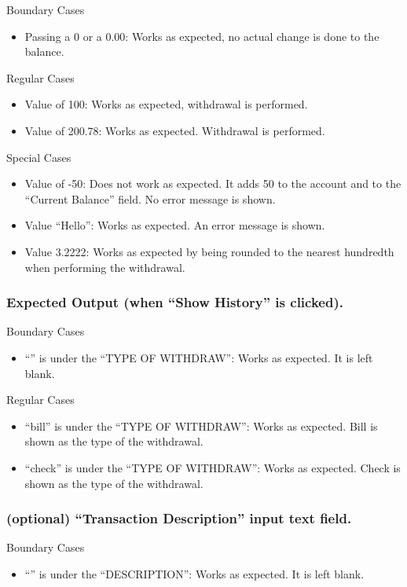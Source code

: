 \documentclass[12pt]{article}
\begin{document}
Boundary Cases
\begin{itemize}
  \item Passing a 0 or a 0.00: Works as expected, no actual change is done to the balance.
\end{itemize}

Regular Cases
\begin{itemize}
  \item Value of 100: Works as expected, withdrawal is performed.
  \item Value of 200.78: Works as expected. Withdrawal is performed.
\end{itemize}

Special Cases
\begin{itemize}
  \item Value of -50: Does not work as expected.  It adds 50 to the account and to the “Current Balance” field. No error message is shown.
  \item Value “Hello”: Works as expected. An error message is shown.
  \item Value 3.2222: Works as expected by being rounded to the nearest hundredth when performing the withdrawal. 
\end{itemize}

\subsubsection{Expected Output (when “Show History” is clicked).}

Boundary Cases
\begin{itemize}
  \item “” is under the “TYPE OF WITHDRAW”: Works as expected. It is left blank.
\end{itemize}

Regular Cases
\begin{itemize}
  \item “bill” is under the “TYPE OF WITHDRAW”: Works as expected. Bill is shown as the type of the withdrawal.
  \item “check” is under the “TYPE OF WITHDRAW”: Works as expected. Check is shown as the type of the withdrawal.
\end{itemize}

\subsubsection{(optional) “Transaction Description” input text field.}

Boundary Cases
\begin{itemize}
  \item “” is under the “DESCRIPTION”: Works as expected. It is left blank.
\end{itemize}
\end{document}
